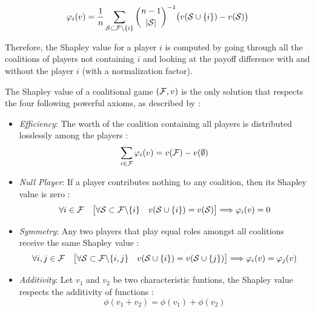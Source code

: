 \begin{definition}
    \begin{equation}
        \varphi_i(v) = \frac{1}{n} \sum_{\mathcal{S} \subset \mathcal{F}\backslash\{i\}} \binom{n-1}{|\mathcal{S}|}^{-1} \bigl( v(\mathcal{S} \cup \{i\}) - v(\mathcal{S}) \bigr)
    \end{equation}
\end{definition}

Therefore, the Shapley value for a player $i$ is computed by going through all the coalitions of players not containing $i$ and looking at the payoff difference with and without the player $i$ (with a normalization factor).

The Shapley value of a coalitional game $(\mathcal{F}, v)$ is the only solution that respects the four following powerful axioms, as described by \textcite{fryer_shapley_2021}:
\begin{itemize}
    \item \emph{Efficiency}: The worth of the coalition containing all players is distributed losslessly
    among the players :
    \begin{equation} 
        \label{eq:efficiency}
        \sum_{i \in \mathcal{F}} \varphi_i(v) = v(\mathcal{F}) - v(\emptyset)
    \end{equation}
    
    \item \emph{Null Player}: If a player contributes nothing to any coalition, then its Shapley value is zero :
    \begin{equation} 
        \label{eq:null_player}
        \forall i \in \mathcal{F} \quad \bigl[ \forall \mathcal{S} \subset \mathcal{F}\backslash\{i\} \quad v(\mathcal{S} \cup \{i\}) = v(\mathcal{S}) \bigr] \Longrightarrow \varphi_i(v) = 0
    \end{equation}

    \item \emph{Symmetry}: Any two players that play equal roles amongst all coalitions receive the same Shapley value :
    \begin{equation} 
        \label{eq:symmetry}
        \forall i,j \in \mathcal{F} \quad \bigl[\forall \mathcal{S} \subset \mathcal{F}\backslash\{i,j\}\quad v(\mathcal{S} \cup \{i\}) = v(\mathcal{S} \cup \{j\}) \bigr] \Longrightarrow \varphi_i(v) = \varphi_j(v)
    \end{equation}

    \item \emph{Additivity}: Let $v_1$ and $v_2$ be two characteristic funtions, the Shapley value respects 
    the additivity of functions :
    \begin{equation} 
        \label{eq:additivity}
        \phi(v_1 + v_2) = \phi(v_1) + \phi(v_2)
    \end{equation}
\end{itemize}

